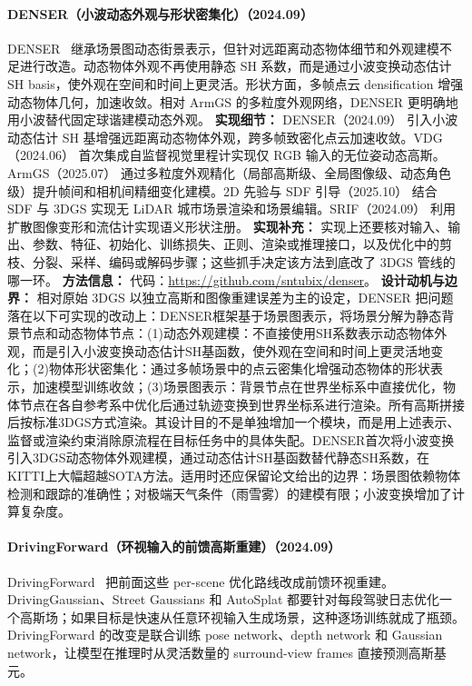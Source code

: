 \paragraph{DENSER（小波动态外观与形状密集化）（2024.09）}
DENSER~\cite{2409_10041} 继承场景图动态街景表示，但针对远距离动态物体细节和外观建模不足进行改造。动态物体外观不再使用静态 SH 系数，而是通过小波变换动态估计 SH basis，使外观在空间和时间上更灵活。形状方面，多帧点云 densification 增强动态物体几何，加速收敛。相对 ArmGS 的多粒度外观网络，DENSER 更明确地用小波替代固定球谐建模动态外观。
\textbf{实现细节：} DENSER（2024.09） 引入小波动态估计 SH 基增强远距离动态物体外观，跨多帧致密化点云加速收敛。VDG（2024.06） 首次集成自监督视觉里程计实现仅 RGB 输入的无位姿动态高斯。ArmGS（2025.07） 通过多粒度外观精化（局部高斯级、全局图像级、动态角色级）提升帧间和相机间精细变化建模。2D 先验与 SDF 引导（2025.10） 结合 SDF 与 3DGS 实现无 LiDAR 城市场景渲染和场景编辑。SRIF（2024.09） 利用扩散图像变形和流估计实现语义形状注册。
\textbf{实现补充：} 实现上还要核对输入、输出、参数、特征、初始化、训练损失、正则、渲染或推理接口，以及优化中的剪枝、分裂、采样、编码或解码步骤；这些抓手决定该方法到底改了 3DGS 管线的哪一环。
\textbf{方法信息：} 代码：\url{https://github.com/sntubix/denser}。
\textbf{设计动机与边界：} 相对原始 3DGS 以独立高斯和图像重建误差为主的设定，DENSER 把问题落在以下可实现的改动上：DENSER框架基于场景图表示，将场景分解为静态背景节点和动态物体节点：(1)动态外观建模：不直接使用SH系数表示动态物体外观，而是引入小波变换动态估计SH基函数，使外观在空间和时间上更灵活地变化；(2)物体形状密集化：通过多帧场景中的点云密集化增强动态物体的形状表示，加速模型训练收敛；(3)场景图表示：背景节点在世界坐标系中直接优化，物体节点在各自参考系中优化后通过轨迹变换到世界坐标系进行渲染。所有高斯拼接后按标准3DGS方式渲染。其设计目的不是单独增加一个模块，而是用上述表示、监督或渲染约束消除原流程在目标任务中的具体失配。DENSER首次将小波变换引入3DGS动态物体外观建模，通过动态估计SH基函数替代静态SH系数，在KITTI上大幅超越SOTA方法。适用时还应保留论文给出的边界：场景图依赖物体检测和跟踪的准确性；对极端天气条件（雨雪雾）的建模有限；小波变换增加了计算复杂度。
\paragraph{DrivingForward（环视输入的前馈高斯重建）（2024.09）}
DrivingForward~\cite{2409_12753} 把前面这些 per-scene 优化路线改成前馈环视重建。DrivingGaussian、Street Gaussians 和 AutoSplat 都要针对每段驾驶日志优化一个高斯场；如果目标是快速从任意环视输入生成场景，这种逐场训练就成了瓶颈。DrivingForward 的改变是联合训练 pose network、depth network 和 Gaussian network，让模型在推理时从灵活数量的 surround-view frames 直接预测高斯基元。

